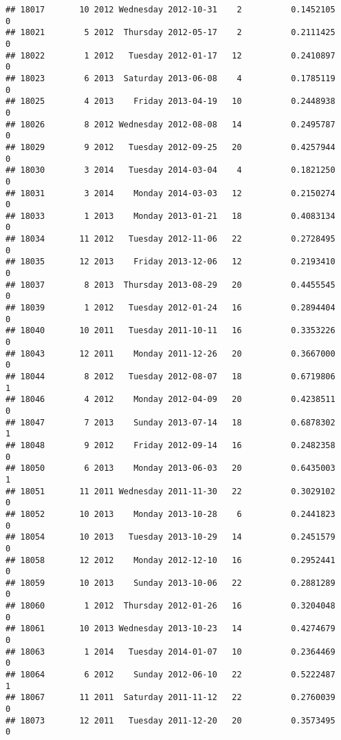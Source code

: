 \documentclass[
]{article}
\begin{document}
\begin{verbatim}
## 18017       10 2012 Wednesday 2012-10-31    2          0.1452105             0
## 18021        5 2012  Thursday 2012-05-17    2          0.2111425             0
## 18022        1 2012   Tuesday 2012-01-17   12          0.2410897             0
## 18023        6 2013  Saturday 2013-06-08    4          0.1785119             0
## 18025        4 2013    Friday 2013-04-19   10          0.2448938             0
## 18026        8 2012 Wednesday 2012-08-08   14          0.2495787             0
## 18029        9 2012   Tuesday 2012-09-25   20          0.4257944             0
## 18030        3 2014   Tuesday 2014-03-04    4          0.1821250             0
## 18031        3 2014    Monday 2014-03-03   12          0.2150274             0
## 18033        1 2013    Monday 2013-01-21   18          0.4083134             0
## 18034       11 2012   Tuesday 2012-11-06   22          0.2728495             0
## 18035       12 2013    Friday 2013-12-06   12          0.2193410             0
## 18037        8 2013  Thursday 2013-08-29   20          0.4455545             0
## 18039        1 2012   Tuesday 2012-01-24   16          0.2894404             0
## 18040       10 2011   Tuesday 2011-10-11   16          0.3353226             0
## 18043       12 2011    Monday 2011-12-26   20          0.3667000             0
## 18044        8 2012   Tuesday 2012-08-07   18          0.6719806             1
## 18046        4 2012    Monday 2012-04-09   20          0.4238511             0
## 18047        7 2013    Sunday 2013-07-14   18          0.6878302             1
## 18048        9 2012    Friday 2012-09-14   16          0.2482358             0
## 18050        6 2013    Monday 2013-06-03   20          0.6435003             1
## 18051       11 2011 Wednesday 2011-11-30   22          0.3029102             0
## 18052       10 2013    Monday 2013-10-28    6          0.2441823             0
## 18054       10 2013   Tuesday 2013-10-29   14          0.2451579             0
## 18058       12 2012    Monday 2012-12-10   16          0.2952441             0
## 18059       10 2013    Sunday 2013-10-06   22          0.2881289             0
## 18060        1 2012  Thursday 2012-01-26   16          0.3204048             0
## 18061       10 2013 Wednesday 2013-10-23   14          0.4274679             0
## 18063        1 2014   Tuesday 2014-01-07   10          0.2364469             0
## 18064        6 2012    Sunday 2012-06-10   22          0.5222487             1
## 18067       11 2011  Saturday 2011-11-12   22          0.2760039             0
## 18073       12 2011   Tuesday 2011-12-20   20          0.3573495             0

\end{verbatim}
\end{document}
